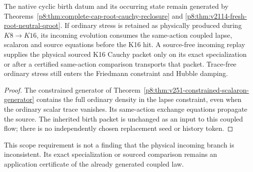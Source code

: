 \documentclass[12pt,a4paper]{article}
\begin{document}
\begin{corollary}
\label{p8:cor:v2186-c06-incoming-source-comparison}
The native cyclic birth datum and its occurring state remain generated by
Theorems~\ref{p8:thm:complete-cap-root-cauchy-reclosure} and
\ref{p8:thm:v2114-fresh-root-neutral-qroot}. If ordinary stress is retained
as physically produced during $K8\to K16$, its incoming evolution consumes
the same-action coupled lapse, scalaron and source equations before the K16
hit. A source-free incoming replay supplies the physical sourced K16 Cauchy
packet only on its exact specialization or after a certified same-action
comparison transports that packet. Trace-free ordinary stress still enters
the Friedmann constraint and Hubble damping.
\end{corollary}
\begin{proof}
The constrained generator of
Theorem~\ref{p8:thm:v251-constrained-scalaron-generator} contains the full
ordinary density in the lapse constraint, even when the ordinary scalar
trace vanishes. Its same-action exchange equations propagate the source.
The inherited birth packet is unchanged as an input to this coupled flow;
there is no independently chosen replacement seed or history token.
\end{proof}
This scope requirement is not a finding that the physical incoming branch is
inconsistent. Its exact specialization or sourced comparison remains an
application certificate of the already generated coupled law.



\end{document}
